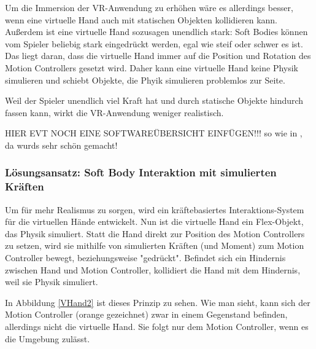
Um die Immersion der VR-Anwendung zu erhöhen wäre es allerdings besser, wenn eine virtuelle Hand auch mit statischen Objekten kollidieren kann. Außerdem ist eine virtuelle Hand sozusagen unendlich stark: Soft Bodies können vom Spieler beliebig stark eingedrückt werden, egal wie steif oder schwer es ist. Das liegt daran, dass die virtuelle Hand immer auf die Position und Rotation des Motion Controllers gesetzt wird. Daher kann eine virtuelle Hand keine Physik simulieren und schiebt Objekte, die Phyik simulieren problemlos zur Seite.

Weil der Spieler unendlich viel Kraft hat und durch statische Objekte hindurch fassen kann, wirkt die VR-Anwendung weniger realistisch.

HIER EVT NOCH EINE SOFTWAREÜBERSICHT EINFÜGEN!!! so wie in \cite{VRSim20}, da wurds sehr schön gemacht!

\subsubsection{Lösungsansatz: Soft Body Interaktion mit simulierten Kräften}
Um für mehr Realismus zu sorgen, wird ein kräftebasiertes Interaktions-System für die virtuellen Hände entwickelt. Nun ist die virtuelle Hand ein Flex-Objekt, das Physik simuliert. Statt die Hand direkt zur Position des Motion Controllers zu setzen, wird sie mithilfe von simulierten Kräften (und Moment) zum Motion Controller bewegt, beziehungsweise "gedrückt". Befindet sich ein Hindernis zwischen Hand und Motion Controller, kollidiert die Hand mit dem Hindernis, weil sie Physik simuliert. 

In Abbildung \ref{VHand2} ist dieses Prinzip zu sehen. Wie man sieht, kann sich der Motion Controller (orange gezeichnet) zwar in einem Gegenstand befinden, allerdings nicht die virtuelle Hand. Sie folgt nur dem Motion Controller, wenn es die Umgebung zulässt.


